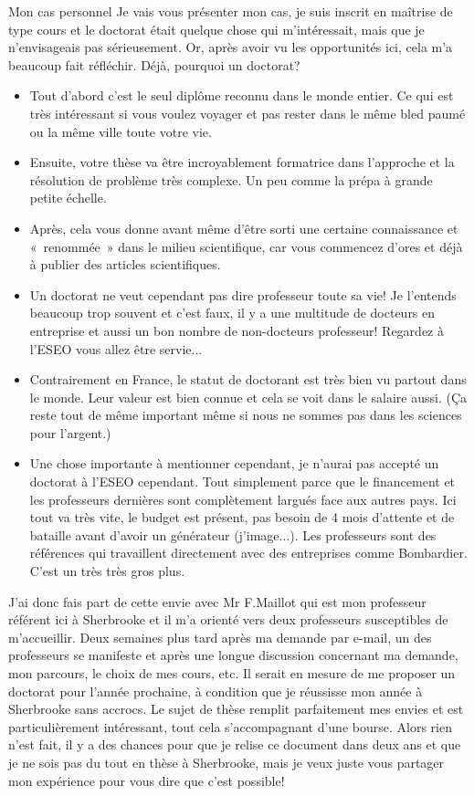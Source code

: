 \begin{example}{Mon cas personnel}
  Je vais vous présenter mon cas, je suis inscrit en maîtrise de type cours et le doctorat était quelque chose qui m’intéressait, mais que je n’envisageais pas sérieusement. Or, après avoir vu les opportunités ici, cela m’a beaucoup fait réfléchir.
  Déjà, pourquoi un doctorat?
  \begin{itemize}
    \item Tout d’abord c’est le seul diplôme reconnu dans le monde entier. Ce qui est très intéressant si vous voulez voyager et pas rester dans le même bled paumé ou la même ville toute votre vie.
    \item Ensuite, votre thèse va être incroyablement formatrice dans l’approche et la résolution de problème très complexe. Un peu comme la prépa à grande petite échelle.
    \item Après, cela vous donne avant même d’être sorti une certaine connaissance et « renommée » dans le milieu scientifique, car vous commencez d’ores et déjà à publier des articles scientifiques.
    \item Un doctorat ne veut cependant pas dire professeur toute sa vie! Je l’entends beaucoup trop souvent et c’est faux, il y a une multitude de docteurs en entreprise et aussi un bon nombre de non-docteurs professeur! Regardez à l’ESEO vous allez être servie...
    \item Contrairement en France, le statut de doctorant est très bien vu partout dans le monde. Leur valeur est bien connue et cela se voit dans le salaire aussi. (Ça reste tout de même important même si nous ne sommes pas dans les sciences pour l’argent.)
    \item Une chose importante à mentionner cependant, je n’aurai pas accepté un doctorat à l’ESEO cependant. Tout simplement parce que le financement et les professeurs dernières sont complètement largués face aux autres pays. Ici tout va très vite, le budget est présent, pas besoin de 4 mois d’attente et de bataille avant d’avoir un générateur (j’image...). Les professeurs sont des références qui travaillent directement avec des entreprises comme Bombardier. C’est un très très gros plus.
  \end{itemize}

  J’ai donc fais part de cette envie avec Mr F.Maillot qui est mon professeur référent ici à Sherbrooke et il m’a orienté vers deux professeurs susceptibles de m’accueillir.
  Deux semaines plus tard après ma demande par e-mail, un des professeurs se manifeste et après une longue discussion concernant ma demande, mon parcours, le choix de mes cours, etc. Il serait en mesure de me proposer un doctorat pour l’année prochaine, à condition que je réussisse mon année à Sherbrooke sans accrocs. Le sujet de thèse remplit parfaitement mes envies et est particulièrement intéressant, tout cela s’accompagnant d’une bourse.
  Alors rien n’est fait, il y a des chances pour que je relise ce document dans deux ans et que je ne sois pas du tout en thèse à Sherbrooke, mais je veux juste vous partager mon expérience pour vous dire que c’est possible!
\end{example}

